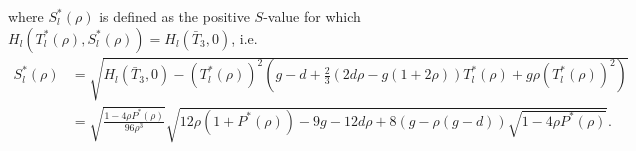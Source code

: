 \documentclass[a4paper,10pt,abstract=true,parskip=true]{scrartcl}
\theoremstyle{remark}
\numberwithin{equation}{section}
\numberwithin{thm}{section}
\begin{document}
where $S^\ast_l(\rho)$ is defined as the positive $S$-value for which $H_l(T_l^\ast(\rho),S^\ast_l(\rho)) = H_l(\bar{T}_3,0)$, i.e.
\begin{align}\label{eq:Sl}
    S^\ast_l(\rho) &= \sqrt{H_l(\bar{T}_3,0)- (T_l^\ast(\rho))^2\left(g-d + \frac{2}{3}(2 d \rho -g(1+2\rho)) T_l^\ast(\rho) + g \rho (T_l^\ast(\rho))^2\right)}\\
    &= \sqrt{\frac{1-4 \rho P^\ast(\rho)}{96 \rho^3}}\sqrt{12 \rho(1+P^\ast(\rho)) - 9 g - 12 d \rho + 8(g - \rho(g-d))\sqrt{1-4 \rho P^\ast(\rho)}}.~\nonumber
\end{align}


\end{document}
